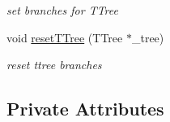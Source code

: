 \begin{DoxyCompactItemize}
\begin{DoxyCompactList}\small\item\em set branches for T\+Tree \end{DoxyCompactList}\item 
void \hyperlink{classanalysis_1_1SecondShowerTagger_a5026654846e851c80c452c63238a67f1}{reset\+T\+Tree} (T\+Tree $\ast$\+\_\+tree)\hypertarget{classanalysis_1_1SecondShowerTagger_a5026654846e851c80c452c63238a67f1}{}\label{classanalysis_1_1SecondShowerTagger_a5026654846e851c80c452c63238a67f1}

\begin{DoxyCompactList}\small\item\em reset ttree branches \end{DoxyCompactList}\end{DoxyCompactItemize}
\subsection*{Private Attributes}
